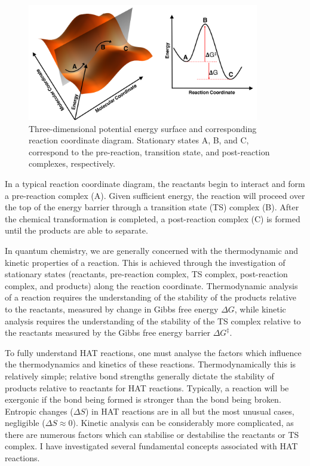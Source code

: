 \begin{figure}[htb]
  \centering
  \includegraphics[width=0.9\textwidth]{figures/pes-1}
  \caption[Three-dimensional potential energy surface and corresponding reaction coordinate diagram.]{Three-dimensional potential energy surface and corresponding reaction coordinate diagram. Stationary states A, B, and C, correspond to the pre-reaction, transition state, and post-reaction complexes, respectively.}
\label{fig:pes}
\end{figure}

\noindent In a typical reaction coordinate diagram, the reactants begin to interact and form a pre-reaction complex (A). Given sufficient energy, the reaction will proceed over the top of the energy barrier through a transition state (TS) complex (B). After the chemical transformation is completed, a post-reaction complex (C) is formed until the products are able to separate.

In quantum chemistry, we are generally concerned with the thermodynamic and kinetic properties of a reaction. This is achieved through the investigation of stationary states (reactants, pre-reaction complex, TS complex, post-reaction complex, and products) along the reaction coordinate. Thermodynamic analysis of a reaction requires the understanding of the stability of the products relative to the reactants, measured by change in Gibbs free energy $\Delta G$, while kinetic analysis requires the understanding of the stability of the TS complex relative to the reactants measured by the Gibbs free energy barrier $\Delta G^{\ddagger}$.

To fully understand HAT reactions, one must analyse the factors which influence the thermodynamics and kinetics of these reactions. Thermodynamically this is relatively simple; relative bond strengths generally dictate the stability of products relative to reactants for HAT reactions. Typically, a reaction will be exergonic if the bond being formed is stronger than the bond being broken. Entropic changes ($\Delta S$) in HAT reactions are in all but the most unusual cases, negligible ($\Delta S \approx 0$).\cite{Mader2007} Kinetic analysis can be considerably more complicated, as there are numerous factors which can stabilise or destabilise the reactants or TS complex. I have investigated several fundamental concepts associated with HAT reactions.

